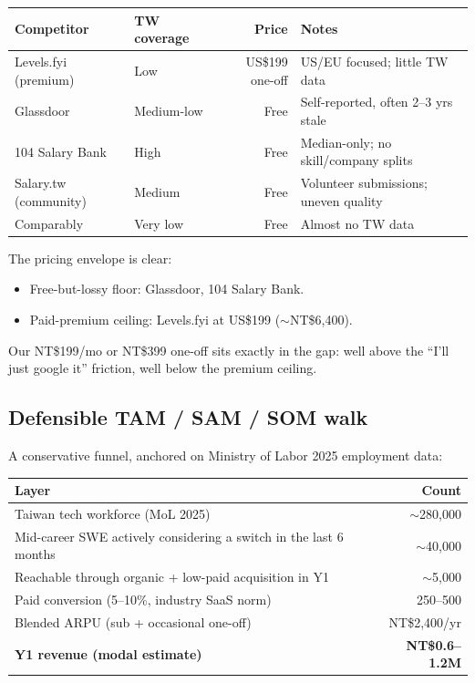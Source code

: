 \documentclass[11pt,a4paper]{article}
\begin{document}
\begin{center}\small
\begin{tabular}{llrl}
\toprule
\textbf{Competitor} & \textbf{TW coverage} & \textbf{Price} & \textbf{Notes} \\
\midrule
Levels.fyi (premium)    & Low          & US\$199 one-off & US/EU focused; little TW data \\
Glassdoor               & Medium-low   & Free            & Self-reported, often 2--3 yrs stale \\
104 Salary Bank         & High         & Free            & Median-only; no skill/company splits \\
Salary.tw (community)   & Medium       & Free            & Volunteer submissions; uneven quality \\
Comparably              & Very low     & Free            & Almost no TW data \\
\bottomrule
\end{tabular}
\end{center}

The pricing envelope is clear:

\begin{itemize}[leftmargin=*,itemsep=0.1em,topsep=0.2em]
  \item Free-but-lossy floor: Glassdoor, 104 Salary Bank.
  \item Paid-premium ceiling: Levels.fyi at US\$199 ($\sim$NT\$6,400).
\end{itemize}

Our NT\$199/mo or NT\$399 one-off sits exactly in the gap: well above the
``I'll just google it'' friction, well below the premium ceiling.

\subsection{Defensible TAM / SAM / SOM walk}

A conservative funnel, anchored on Ministry of Labor 2025 employment data:

\begin{center}\small
\begin{tabular}{lr}
\toprule
\textbf{Layer} & \textbf{Count} \\
\midrule
Taiwan tech workforce (MoL 2025)                                   & $\sim$280,000 \\
Mid-career SWE actively considering a switch in the last 6 months  & $\sim$40,000  \\
Reachable through organic + low-paid acquisition in Y1             & $\sim$5,000   \\
Paid conversion (5--10\%, industry SaaS norm)                      & 250--500      \\
Blended ARPU (sub + occasional one-off)                            & NT\$2,400/yr  \\
\textbf{Y1 revenue (modal estimate)}                               & \textbf{NT\$0.6--1.2M} \\
\bottomrule
\end{tabular}
\end{center}
\end{document}
